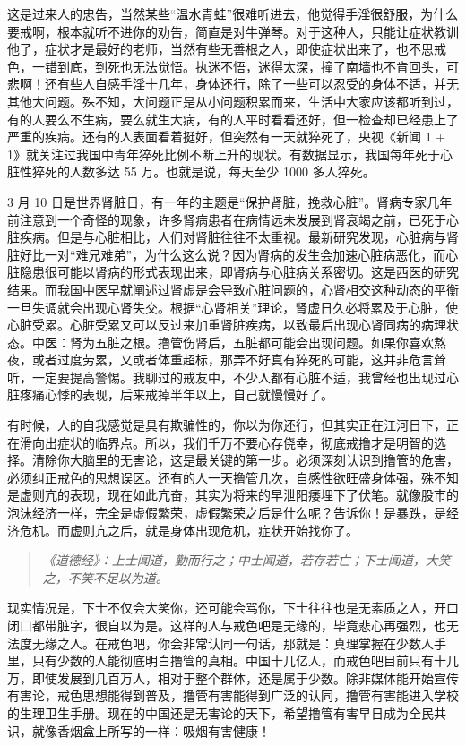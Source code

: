 \documentclass{ctexart}
\begin{document}
这是过来人的忠告，当然某些“温水青蛙”很难听进去，他觉得手淫很舒服，为什么要戒啊，根本就听不进你的劝告，简直是对牛弹琴。对于这种人，只能让症状教训他了，症状才是最好的老师，当然有些无善根之人，即使症状出来了，也不思戒色，一错到底，到死也无法觉悟。执迷不悟，迷得太深，撞了南墙也不肯回头，可悲啊！还有些人自感手淫十几年，身体还行，除了一些可以忍受的身体不适，并无其他大问题。殊不知，大问题正是从小问题积累而来，生活中大家应该都听到过，有的人要么不生病，要么就生大病，有的人平时看看还好，但一检查却已经患上了严重的疾病。还有的人表面看着挺好，但突然有一天就猝死了，央视《新闻 1 + 1》就关注过我国中青年猝死比例不断上升的现状。有数据显示，我国每年死于心脏性猝死的人数多达 55 万。也就是说，每天至少 1000 多人猝死。

3 月 10 日是世界肾脏日，有一年的主题是“保护肾脏，挽救心脏”。肾病专家几年前注意到一个奇怪的现象，许多肾病患者在病情远未发展到肾衰竭之前，已死于心脏疾病。但是与心脏相比，人们对肾脏往往不太重视。最新研究发现，心脏病与肾脏好比一对“难兄难弟”，为什么这么说？因为肾病的发生会加速心脏病恶化，而心脏隐患很可能以肾病的形式表现出来，即肾病与心脏病关系密切。这是西医的研究结果。而我国中医早就阐述过肾虚是会导致心脏问题的，心肾相交这种动态的平衡一旦失调就会出现心肾失交。根据“心肾相关”理论，肾虚日久必将累及于心脏，使心脏受累。心脏受累又可以反过来加重肾脏疾病，以致最后出现心肾同病的病理状态。中医：肾为五脏之根。撸管伤肾后，五脏都可能会出现问题。如果你喜欢熬夜，或者过度劳累，又或者体重超标，那弄不好真有猝死的可能，这并非危言耸听，一定要提高警惕。我聊过的戒友中，不少人都有心脏不适，我曾经也出现过心脏疼痛心悸的表现，后来戒掉半年以上，自己就慢慢好了。

有时候，人的自我感觉是具有欺骗性的，你以为你还行，但其实正在江河日下，正在滑向出症状的临界点。所以，我们千万不要心存侥幸，彻底戒撸才是明智的选择。清除你大脑里的无害论，这是最关键的第一步。必须深刻认识到撸管的危害，必须纠正戒色的思想误区。还有的人一天撸管几次，自感性欲旺盛身体强，殊不知是虚则亢的表现，现在如此亢奋，其实为将来的早泄阳痿埋下了伏笔。就像股市的泡沫经济一样，完全是虚假繁荣，虚假繁荣之后是什么呢？告诉你！是暴跌，是经济危机。而虚则亢之后，就是身体出现危机，症状开始找你了。

\begin{quote}\it
    《道德经》：上士闻道，勤而行之；中士闻道，若存若亡；下士闻道，大笑之，不笑不足以为道。
\end{quote}

现实情况是，下士不仅会大笑你，还可能会骂你，下士往往也是无素质之人，开口闭口都带脏字，很自以为是。这样的人与戒色吧是无缘的，毕竟悲心再强烈，也无法度无缘之人。在戒色吧，你会非常认同一句话，那就是：真理掌握在少数人手里，只有少数的人能彻底明白撸管的真相。中国十几亿人，而戒色吧目前只有十几万，即使发展到几百万人，相对于整个群体，还是属于少数。除非媒体能开始宣传有害论，戒色思想能得到普及，撸管有害能得到广泛的认同，撸管有害能进入学校的生理卫生手册。现在的中国还是无害论的天下，希望撸管有害早日成为全民共识，就像香烟盒上所写的一样：吸烟有害健康！
\end{document}
